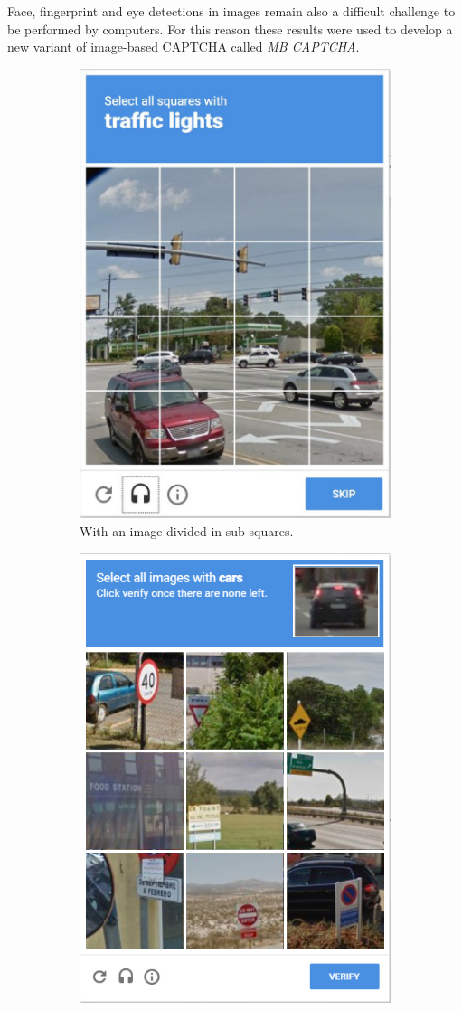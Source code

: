 \begin{itemize}
{Face, fingerprint and eye detections in images remain also a difficult challenge to be performed by computers. For this reason these results were used to develop a new variant of image-based CAPTCHA called \textit{MB CAPTCHA}\cite{MB_CAPTCHA}.
\begin{figure}[h]
     \centering
     \begin{subfigure}[b]{0.48\textwidth}
         \centering
         \includegraphics[width=.75\linewidth]{Images/StateOfArt/selection_CAPTCHA}
         \caption{\footnotesize{With an image divided in sub-squares.}}
         \label{soa:selection}
     \end{subfigure}
     \hfill
     \begin{subfigure}[b]{0.48\textwidth}
         \centering
         \includegraphics[width=.6\linewidth]{Images/StateOfArt/selection_CAPTCHA2}

\end{subfigure}
\end{figure}}
\end{itemize}
